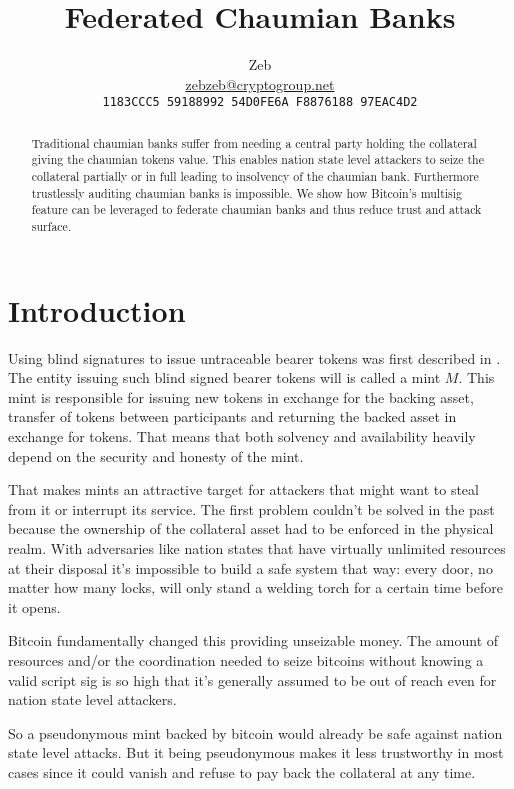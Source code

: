 \documentclass[10pt,a4paper,twocolumn]{article}
\author{Zeb\\\href{mailto:zebzeb@cryptogroup.net}{zebzeb@cryptogroup.net}\\\texttt{\footnotesize 1183CCC5 59188992 54D0FE6A F8876188 97EAC4D2}}
\title{Federated Chaumian Banks}
\begin{document}
	\maketitle
	
	\begin{abstract}
		Traditional chaumian banks suffer from needing a central party holding the collateral giving the chaumian tokens value. This enables nation state level attackers to seize the collateral partially or in full leading to insolvency of the chaumian bank. Furthermore trustlessly auditing chaumian banks is impossible. We show how Bitcoin's multisig feature can be leveraged to federate chaumian banks and thus reduce  trust and attack surface.
	\end{abstract}

\section{Introduction}
Using blind signatures to issue untraceable bearer tokens was first described in \cite{Chaum82}.
The entity issuing such blind signed bearer tokens will is called a mint $M$.
This mint is responsible for issuing new tokens in exchange for the backing asset, transfer of tokens between participants and returning the backed asset in exchange for tokens.
That means that both solvency and availability heavily depend on the security and honesty of the mint.

That makes mints an attractive target for attackers that might want to steal from it or interrupt its service.
The first problem couldn't be solved in the past because the ownership of the collateral asset had to be enforced in the physical realm.
With adversaries like nation states that have virtually unlimited resources at their disposal it's impossible to build a safe system that way: every door, no matter how many locks, will only stand a welding torch for a certain time before it opens.

Bitcoin fundamentally changed this providing unseizable money.
The amount of resources and/or the coordination needed to seize bitcoins without knowing a valid script sig is so high that it's generally assumed to be out of reach even for nation state level attackers.

So a pseudonymous mint backed by bitcoin would already be safe against nation state level attacks.
But it being pseudonymous makes it less trustworthy in most cases since it could vanish and refuse to pay back the collateral at any time.
\end{document}
